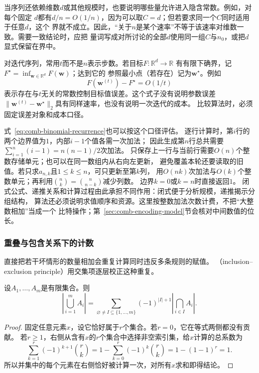当序列还依赖维数$d$或其他规模时，也要说明哪些量允许进入隐含常数。例如，对每个固定
$d$都有$d/n=O(1/n)$，因为可以取$C=d$；但若要求同一个$C$同时适用于任意$d$，这个
界就不成立。因此，“关于$n$是某个速率”不等于该速率对维数一致。需要一致结论时，应把
量词写成对所讨论的全部$d$使用同一组$C$与$n_0$，或把$d$显式保留在界中。

对迭代序列，常用$t$而不是$n$表示步数。若目标$F:\mathbb{R}^d\to\mathbb{R}$
有有限下确界，记$F^\star=\inf_{\bm{w}\in\mathbb{R}^d}F(\bm{w})$；达到它的
参照最小点（若存在）记为$\bm{w}^\star$。例如
\[
  F(\bm{w}^{(t)})-F^\star=O(1/t)
\]
表示存在与$t$无关的常数控制目标值误差。这个式子没有说明参数误差
$\lVert\bm{w}^{(t)}-\bm{w}^\star\rVert_2$具有同样速率，也没有说明一次迭代的成本。
比较算法时，必须固定误差对象和成本口径。

式~\eqref{eq:comb-binomial-recurrence}也可以按这个口径评估。
逐行计算时，第$i$行的两个边界值为$1$，内部$i-1$个值各需一次加法；
因此生成第$n$行总共需要$\sum_{i=1}^n(i-1)=n(n-1)/2$次加法。
只保存上一行与当前行需要$O(n)$个整数存储单元；也可以在同一数组内从右向左更新，
避免覆盖本轮还要读取的旧值。若只求$a_{n,k}$且$1\leq k\leq n$，可只更新至第$k$列，
用$O(nk)$次加法与$O(k)$个整数单元；再利用$\binom nk=\binom n{n-k}$减少列数。
边界$k=0$或$k=n$时直接返回$1$。
闭式公式、递推关系和计算过程由此承担不同作用：闭式便于分析规模，递推揭示分组结构，
算法还必须说明求值顺序和资源。这里按整数加法次数计费，不把“大整数相加”当成一个
比特操作；第~\ref{sec:comb-encoding-model}节会核对中间数值的位长。

\subsubsection{重叠与包含关系下的计数}
\label{sec:comb-inclusion-mobius}

直接把若干坏情形的数量相加会重复计算同时违反多条规则的赋值。
（inclusion--exclusion principle）用交集项逐层校正这种重复。

\begin{theorem}[有限容斥原理]
\label{thm:comb-inclusion-exclusion}
设$A_1,\ldots,A_m$是有限集合。则
\begin{equation}
  \left|\bigcup_{i=1}^{m}A_i\right|
  =
  \sum_{\varnothing\neq I\subseteq\{1,\ldots,m\}}
  (-1)^{|I|+1}
  \left|\bigcap_{i\in I}A_i\right|.
  \label{eq:comb-inclusion-exclusion}
\end{equation}
\end{theorem}

\begin{proof}
固定任意元素$x$，设它恰好属于$r$个集合。若$r=0$，它在等式两侧都没有贡献。
若$r\geq1$，右侧从含有$x$的$r$个集合中选择非空索引集，给$x$计算的总系数为
\[
  \sum_{k=1}^{r}(-1)^{k+1}\binom{r}{k}
  =
  1-\sum_{k=0}^{r}(-1)^k\binom{r}{k}
  =1-(1-1)^r=1.
\]
所以并集中的每个元素在右侧恰好被计算一次，对所有$x$求和即得结论。
\end{proof}

